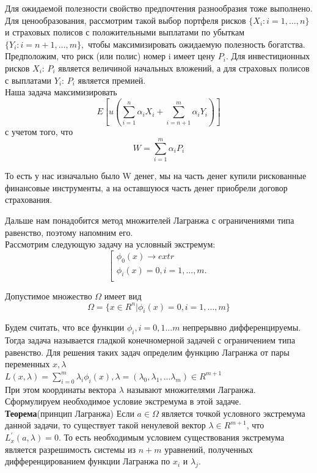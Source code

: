 \documentclass[12pt,a4paper]{article}
\begin{document}
Для ожидаемой полезности свойство предпочтения разнообразия тоже выполнено.\\

Для ценообразования, рассмотрим такой выбор портфеля рисков $\{ X_i: i=1, \dots, n \}$ и страховых полисов с положительными выплатами  по убыткам $\{ Y_i: i=n+1, \dots, m \}, $ чтобы максимизировать ожидаемую полезность богатства. Предположим, что риск (или полис) номер i имеет цену $P_i.$ Для инвестиционных рисков $X_i$: $P_i$ является величиной начальных вложений, а для страховых полисов с выплатами $Y_i$: $P_i$ является премией.\\

Наша задача максимизировать 
$$E \left[ u \left(  \sum\limits_{i=1}^{n} \alpha_i X_i +  \sum\limits_{i=n+1}^{m} \alpha_i Y_i \right)  \right] $$
с учетом того, что $$W=  \sum\limits_{i=1}^{m} \alpha_i P_i$$

То есть у нас изначально было W денег, мы на часть денег купили рискованные финансовые инструменты, а на оставшуюся часть денег приобрели договор страхования.

Дальше нам понадобится метод множителей Лагранжа с ограничениями типа равенство, поэтому напомним его. \\
Рассмотрим следующую задачу на условный экстремум:
$$\left[ \begin{array}{crl}
\phi_{0} (x) \rightarrow extr\\
\phi_{i} (x)=0 , i=1, ..., m.\\
\end{array}\right. $$

Допустимое множество $\Omega$ имеет вид
$$\Omega = \{x \in R^{n} | \phi_{i}(x)=0, i =1, ..., m\}$$

Будем считать, что все функции $\phi_{i}, i = 0,1 ... m$ непрерывно дифференцируемы. Тогда задача называется гладкой конечномерной задачей с ограничением типа равенство. Для решения таких задач определим функцию Лагранжа  от пары переменных $x,\lambda$\\
$L(x,\lambda) = \sum\limits_{i=0}^{m} \lambda_{i} \phi_{i}(x), \lambda = (\lambda_{0}, \lambda_{1}, ... \lambda_{m}) \in R^{m+1}$\\
При этом координаты вектора $\lambda$ называют множителями Лагранжа.\\
Сформулируем необходимое условие экстремума в этой задаче.\\

{\large \bf Теорема}(принцип Лагранжа) Если $a \in \Omega $ является точкой условного экстремума данной задачи, то существует такой ненулевой вектор $\lambda \in R^{m+1}$, что $L^{'}_{x} (a, \lambda) = 0$. То есть необходимым условием существования экстремума является разрешимость системы из $n+m$ уравнений, полученных дифференцированием функции Лагранжа по $x_i$ и $\lambda_j$.\\
\end{document}
